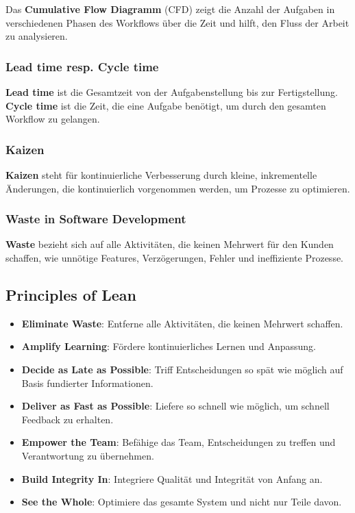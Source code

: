 Das \textbf{Cumulative Flow Diagramm} (CFD) zeigt die Anzahl der Aufgaben in verschiedenen Phasen des Workflows über die Zeit und hilft, den Fluss der Arbeit zu analysieren.

\subsubsection{Lead time resp. Cycle time}

\textbf{Lead time} ist die Gesamtzeit von der Aufgabenstellung bis zur Fertigstellung. \textbf{Cycle time} ist die Zeit, die eine Aufgabe benötigt, um durch den gesamten Workflow zu gelangen.

\subsubsection{Kaizen}

\textbf{Kaizen} steht für kontinuierliche Verbesserung durch kleine, inkrementelle Änderungen, die kontinuierlich vorgenommen werden, um Prozesse zu optimieren.

\subsubsection{Waste in Software Development}

\textbf{Waste} bezieht sich auf alle Aktivitäten, die keinen Mehrwert für den Kunden schaffen, wie unnötige Features, Verzögerungen, Fehler und ineffiziente Prozesse.

\subsection{Principles of Lean}

\begin{itemize}
    \item \textbf{Eliminate Waste}: Entferne alle Aktivitäten, die keinen Mehrwert schaffen.
    \item \textbf{Amplify Learning}: Fördere kontinuierliches Lernen und Anpassung.
    \item \textbf{Decide as Late as Possible}: Triff Entscheidungen so spät wie möglich auf Basis fundierter Informationen.
    \item \textbf{Deliver as Fast as Possible}: Liefere so schnell wie möglich, um schnell Feedback zu erhalten.
    \item \textbf{Empower the Team}: Befähige das Team, Entscheidungen zu treffen und Verantwortung zu übernehmen.
    \item \textbf{Build Integrity In}: Integriere Qualität und Integrität von Anfang an.
    \item \textbf{See the Whole}: Optimiere das gesamte System und nicht nur Teile davon.
\end{itemize}

